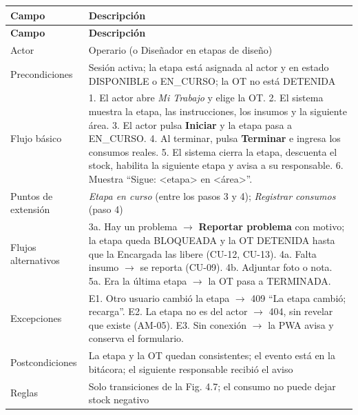 \documentclass[11pt,a4paper]{article}
\begin{document}
\begingroup
\begin{longtable}{@{}>{\raggedright\arraybackslash\hspace{0pt}}p{}>{\raggedright\arraybackslash\hspace{0pt}}p{}@{}}
\toprule
\textbf{Campo} & \textbf{Descripción} \\ \midrule
\endfirsthead
\toprule
\textbf{Campo} & \textbf{Descripción} \\ \midrule
\endhead
\bottomrule
\endlastfoot
\mbox{Actor} & Operario (o Diseñador en etapas de diseño) \\ \addlinespace[0.25em]
Precondiciones & Sesión activa; la etapa está asignada al actor y en estado DISPONIBLE o EN\_CURSO; la OT no está DETENIDA \\ \addlinespace[0.25em]
Flujo básico & 1. El actor abre \textit{Mi Trabajo} y elige la OT. 2. El sistema muestra la etapa, las instrucciones, los insumos y la siguiente área. 3. El actor pulsa \textbf{Iniciar} y la etapa pasa a EN\_CURSO. 4. Al terminar, pulsa \textbf{Terminar} e ingresa los consumos reales. 5. El sistema cierra la etapa, descuenta el stock, habilita la siguiente etapa y avisa a su responsable. 6. Muestra ``Sigue: <etapa> en <área>''. \\ \addlinespace[0.25em]
Puntos de extensión & \textit{Etapa en curso} (entre los pasos 3 y 4); \textit{Registrar consumos} (paso 4) \\ \addlinespace[0.25em]
Flujos alternativos & 3a. Hay un problema \ensuremath{\rightarrow}\allowbreak{} \textbf{Reportar problema} con motivo; la etapa queda BLOQUEADA y la OT DETENIDA hasta que la Encargada las libere (\mbox{CU-12}, \mbox{CU-13}). 4a. Falta insumo \ensuremath{\rightarrow}\allowbreak{} se reporta (\mbox{CU-09}). 4b. Adjuntar foto o nota. 5a. Era la última etapa \ensuremath{\rightarrow}\allowbreak{} la OT pasa a TERMINADA. \\ \addlinespace[0.25em]
\mbox{Excepciones} & E1. Otro usuario cambió la etapa \ensuremath{\rightarrow}\allowbreak{} 409 ``La etapa cambió; recarga''. E2. La etapa no es del actor \ensuremath{\rightarrow}\allowbreak{} 404, sin revelar que existe (\mbox{AM-05}). E3. Sin conexión \ensuremath{\rightarrow}\allowbreak{} la PWA avisa y conserva el formulario. \\ \addlinespace[0.25em]
Postcondiciones & La etapa y la OT quedan consistentes; el evento está en la bitácora; el siguiente responsable recibió el aviso \\ \addlinespace[0.25em]
\mbox{Reglas} & Solo transiciones de la Fig. 4.7; el consumo no puede dejar stock negativo \\
\end{longtable}
\endgroup
\end{document}
